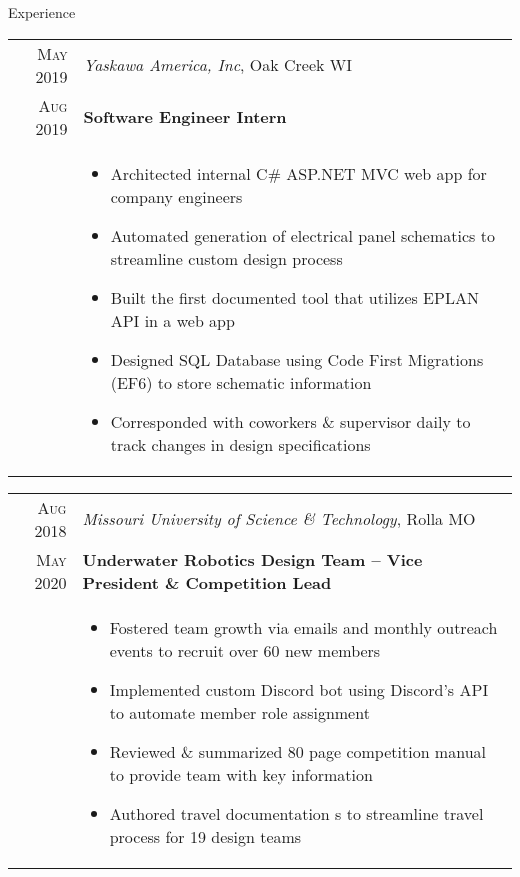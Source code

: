 \documentclass{resume}
\begin{document}
\begin{rSection}{Experience}
{  \begin{tabular}{r|p{15cm}}
    \textsc{May 2019} & \textit{Yaskawa America, Inc}, Oak Creek WI \\
    \textsc{Aug 2019}  & \textbf{Software Engineer Intern} \\ &
    \begin{itemize}
        \item {Architected internal C\# ASP.NET MVC web app for company engineers}
        \item {Automated generation of electrical panel schematics to streamline custom design process}
        \item {Built the first documented tool that utilizes EPLAN API in a web app}
        \item {Designed SQL Database using Code First Migrations (EF6) to store schematic information}
        \item {Corresponded with coworkers \& supervisor daily to track changes in design specifications}
    \end{itemize}
  \end{tabular}

    \begin{tabular}{r|p{15cm}}
      \textsc{Aug 2018} & \textit{Missouri University of Science \& Technology}, Rolla MO \\
      \textsc{May 2020}  & \textbf{Underwater Robotics Design Team – Vice President \& Competition Lead} \\ &
      \begin{itemize}
        \item {Fostered team growth via emails and monthly outreach events to recruit over 60 new members}
        \item {Implemented custom Discord bot using Discord's API to automate member role assignment}
        \item {Reviewed \& summarized 80 page competition manual to provide team with key information}
        \item {Authored travel documentation s to streamline travel process for 19 design teams}
      \end{itemize}
    \end{tabular}

}
\end{rSection}
\end{document}
